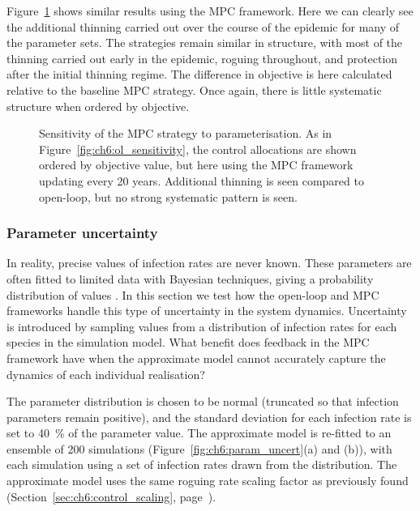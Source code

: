 Figure~\ref{fig:ch6:mpc_sensitivity} shows similar results using the MPC framework. Here we can clearly see the additional thinning carried out over the course of the epidemic for many of the parameter sets. The strategies remain similar in structure, with most of the thinning carried out early in the epidemic, roguing throughout, and protection after the initial thinning regime. The difference in objective is here calculated relative to the baseline MPC strategy. Once again, there is little systematic structure when ordered by objective.

\begin{figure}[t]
    \begin{center}
        \caption[MPC strategy parameter sensitivity]{Sensitivity of the MPC strategy to parameterisation. As in Figure~\ref{fig:ch6:ol_sensitivity}, the control allocations are shown ordered by objective value, but here using the MPC framework updating every 20 years. Additional thinning is seen compared to open-loop, but no strong systematic pattern is seen.\label{fig:ch6:mpc_sensitivity}}
    \end{center}
\end{figure}

\subsubsection{Parameter uncertainty}

In reality, precise values of infection rates are never known. These parameters are often fitted to limited data with Bayesian techniques, giving a probability distribution of values \citep[e.g.][]{kleczkowski_parameter_2007, parry_bayesian_2014, thompson_control_2018, cunniffe_cost-effective_2014}. In this section we test how the open-loop and MPC frameworks handle this type of uncertainty in the system dynamics. Uncertainty is introduced by sampling values from a distribution of infection rates for each species in the simulation model. What benefit does feedback in the MPC framework have when the approximate model cannot accurately capture the dynamics of each individual realisation?

The parameter distribution is chosen to be normal (truncated so that infection parameters remain positive), and the standard deviation for each infection rate is set to \SI{40}{\percent} of the parameter value. The approximate model is re-fitted to an ensemble of 200 simulations (Figure~\ref{fig:ch6:param_uncert}(a) and (b)), with each simulation using a set of infection rates drawn from the distribution. The approximate model uses the same roguing rate scaling factor as previously found (Section~\ref{sec:ch6:control_scaling}, page~\pageref{sec:ch6:control_scaling}).

